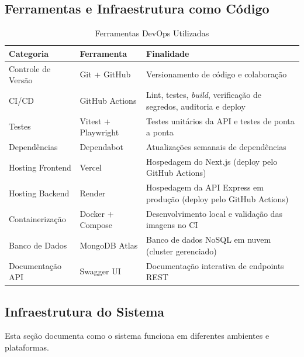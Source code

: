\documentclass[11pt,a4paper]{article}
\begin{document}
\subsection{Ferramentas e Infraestrutura como Código}
\begin{table}[H]
\centering
\caption{Ferramentas DevOps Utilizadas}
\label{tab:devops-tools}
\begin{tabular}{|l|l|p{6cm}|}
\hline
\textbf{Categoria} & \textbf{Ferramenta} & \textbf{Finalidade} \\
\hline
Controle de Versão & Git + GitHub & Versionamento de código e colaboração \\
CI/CD & GitHub Actions & Lint, testes, \textit{build}, verificação de segredos, auditoria e deploy \\
Testes & Vitest + Playwright & Testes unitários da API e testes de ponta a ponta \\
Dependências & Dependabot & Atualizações semanais de dependências \\
Hosting Frontend & Vercel & Hospedagem do Next.js (deploy pelo GitHub Actions) \\
Hosting Backend & Render & Hospedagem da API Express em produção (deploy pelo GitHub Actions) \\
Containerização & Docker + Compose & Desenvolvimento local e validação das imagens no CI \\
Banco de Dados & MongoDB Atlas & Banco de dados NoSQL em nuvem (cluster gerenciado) \\
Documentação API & Swagger UI & Documentação interativa de endpoints REST \\
\hline
\end{tabular}
\end{table}


\subsection{Infraestrutura do Sistema}
Esta seção documenta como o sistema funciona em diferentes ambientes e plataformas.
\end{document}
